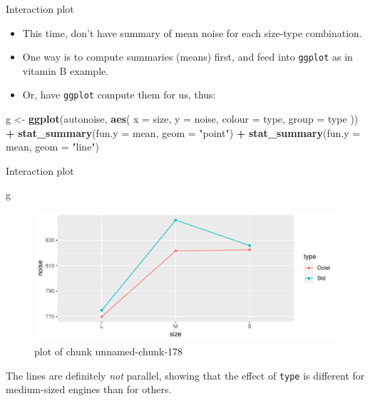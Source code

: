 \documentclass[ignorenonframetext,]{beamer}
\newenvironment{Shaded}{\begin{snugshade}}{\end{snugshade}}
\newcommand{\DataTypeTok}[1]{\textcolor[rgb]{0.13,0.29,0.53}{#1}}
\newcommand{\KeywordTok}[1]{\textcolor[rgb]{0.13,0.29,0.53}{\textbf{#1}}}
\newcommand{\NormalTok}[1]{#1}
\newcommand{\OperatorTok}[1]{\textcolor[rgb]{0.81,0.36,0.00}{\textbf{#1}}}
\newcommand{\StringTok}[1]{\textcolor[rgb]{0.31,0.60,0.02}{#1}}
\begin{document}
\begin{frame}[fragile]{Interaction plot}
\protect\hypertarget{interaction-plot-1}{}

\begin{itemize}
\item
  This time, don't have summary of mean noise for each size-type
  combination.
\item
  One way is to compute summaries (means) first, and feed into
  \texttt{ggplot} as in vitamin B example.
\item
  Or, have \texttt{ggplot} compute them for us, thus:
\end{itemize}

\begin{Shaded}
\begin{Highlighting}[]
\NormalTok{g <-}\StringTok{ }\KeywordTok{ggplot}\NormalTok{(autonoise, }\KeywordTok{aes}\NormalTok{(}
  \DataTypeTok{x =}\NormalTok{ size, }\DataTypeTok{y =}\NormalTok{ noise,}
  \DataTypeTok{colour =}\NormalTok{ type, }\DataTypeTok{group =}\NormalTok{ type}
\NormalTok{)) }\OperatorTok{+}
\StringTok{  }\KeywordTok{stat_summary}\NormalTok{(}\DataTypeTok{fun.y =}\NormalTok{ mean, }\DataTypeTok{geom =} \StringTok{"point"}\NormalTok{) }\OperatorTok{+}
\StringTok{  }\KeywordTok{stat_summary}\NormalTok{(}\DataTypeTok{fun.y =}\NormalTok{ mean, }\DataTypeTok{geom =} \StringTok{"line"}\NormalTok{)}
\end{Highlighting}
\end{Shaded}

\end{frame}

\begin{frame}[fragile]{Interaction plot}
\protect\hypertarget{interaction-plot-2}{}

\begin{Shaded}
\begin{Highlighting}[]
\NormalTok{g}
\end{Highlighting}
\end{Shaded}

\begin{figure}
\centering
\includegraphics{figure/unnamed-chunk-178-1.pdf}
\caption{plot of chunk unnamed-chunk-178}
\end{figure}

The lines are definitely \emph{not} parallel, showing that the effect of
\texttt{type} is different for medium-sized engines than for others.

\end{frame}
\end{document}
